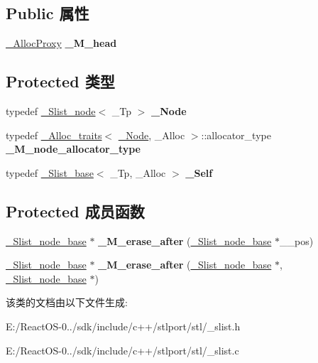 \subsection*{Public 属性}
\begin{DoxyCompactItemize}
\item 
\mbox{\label{class___slist__base_af853f2660305392922ebc4df754795c2}} 
\hyperlink{class___s_t_l_p__alloc__proxy}{\+\_\+\+Alloc\+Proxy} {\bfseries \+\_\+\+M\+\_\+head}
\end{DoxyCompactItemize}
\subsection*{Protected 类型}
\begin{DoxyCompactItemize}
\item 
\mbox{\label{class___slist__base_a3d0c425b528bb760643253743e2b74dc}} 
typedef \hyperlink{class___slist__node}{\+\_\+\+Slist\+\_\+node}$<$ \+\_\+\+Tp $>$ {\bfseries \+\_\+\+Node}
\item 
\mbox{\label{class___slist__base_aba043211e4fd0fff0fbd8d4d116360b7}} 
typedef \hyperlink{struct___alloc__traits}{\+\_\+\+Alloc\+\_\+traits}$<$ \hyperlink{class___slist__node}{\+\_\+\+Node}, \+\_\+\+Alloc $>$\+::allocator\+\_\+type {\bfseries \+\_\+\+M\+\_\+node\+\_\+allocator\+\_\+type}
\item 
\mbox{\label{class___slist__base_a398c53dc26a96e54de31b3d6ea0f595d}} 
typedef \hyperlink{class___slist__base}{\+\_\+\+Slist\+\_\+base}$<$ \+\_\+\+Tp, \+\_\+\+Alloc $>$ {\bfseries \+\_\+\+Self}
\end{DoxyCompactItemize}
\subsection*{Protected 成员函数}
\begin{DoxyCompactItemize}
\item 
\mbox{\label{class___slist__base_af503dac1953a59b233d946208886ee4a}} 
\hyperlink{struct___slist__node__base}{\+\_\+\+Slist\+\_\+node\+\_\+base} $\ast$ {\bfseries \+\_\+\+M\+\_\+erase\+\_\+after} (\hyperlink{struct___slist__node__base}{\+\_\+\+Slist\+\_\+node\+\_\+base} $\ast$\+\_\+\+\_\+pos)
\item 
\mbox{\label{class___slist__base_a173d9c26ed9f84d8c5f53d4c9e67e0a2}} 
\hyperlink{struct___slist__node__base}{\+\_\+\+Slist\+\_\+node\+\_\+base} $\ast$ {\bfseries \+\_\+\+M\+\_\+erase\+\_\+after} (\hyperlink{struct___slist__node__base}{\+\_\+\+Slist\+\_\+node\+\_\+base} $\ast$, \hyperlink{struct___slist__node__base}{\+\_\+\+Slist\+\_\+node\+\_\+base} $\ast$)
\end{DoxyCompactItemize}


该类的文档由以下文件生成\+:\begin{DoxyCompactItemize}
\item 
E\+:/\+React\+O\+S-\/0../sdk/include/c++/stlport/stl/\+\_\+slist.\+h\item 
E\+:/\+React\+O\+S-\/0../sdk/include/c++/stlport/stl/\+\_\+slist.\+c\end{DoxyCompactItemize}
